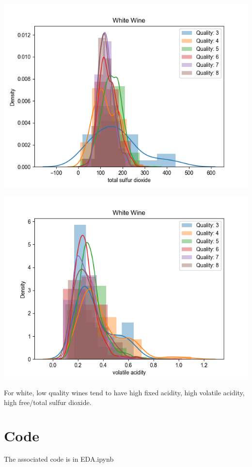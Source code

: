 \documentclass[12pt, letterpaper]{article}
\begin{document}
\includegraphics[scale=\myscale]{white_quality_dist_total_sulfur_dioxide.png}

\includegraphics[scale=\myscale]{white_quality_dist_volatile_acidity.png}

For white, low quality wines tend to have high fixed acidity, high volatile acidity, high free/total sulfur dioxide.

\section{Code} %

The associated code is in EDA.ipynb
\end{document}
